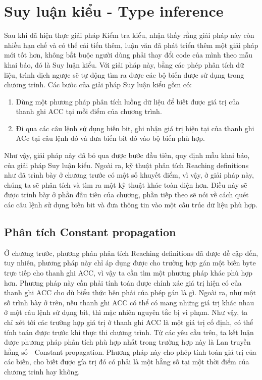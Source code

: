 \section{Suy luận kiểu - Type inference}
Sau khi đã hiện thực giải pháp Kiểm tra kiểu, nhận thấy rằng giải pháp này còn nhiều hạn chế và có thể cải tiến thêm, luận văn đã phát triển thêm một giải pháp mới tốt hơn, không bắt buộc người dùng phải thay đổi code của mình theo mẫu khai báo, đó là Suy luận kiểu. Với giải pháp này, bằng các phép phân tích dữ liệu, trình dịch ngược sẽ tự động tìm ra được các bộ biến được sử dụng trong chương trình. Các bước của giải pháp Suy luận kiểu gồm có:
\begin{enumerate}
	\item Dùng một phương pháp phân tích luồng dữ liệu để biết được giá trị của thanh ghi ACC tại mỗi điểm của chương trình.
	\item Đi qua các câu lệnh sử dụng biến bit, ghi nhận giá trị hiện tại của thanh ghi ACc tại câu lệnh đó và đưa biến bit đó vào bộ biến phù hợp.
\end{enumerate}
Như vậy, giải pháp này đã bỏ qua được bước đầu tiên, quy định mẫu khai báo, của giải pháp Suy luận kiểu. Ngoài ra, kỹ thuật phân tích Reaching definitions như đã trình bày ở chương trước có một số khuyết điểm, vì vậy, ở giải pháp này, chúng ta sẽ phân tích và tìm ra một kỹ thuật khác toàn diện hơn. Điều này sẽ được trình bày ở phần đầu tiên của chương, phần tiếp theo sẽ nói về cách quét các câu lệnh sử dụng biến bit và đưa thông tin vào một cấu trúc dữ liệu phù hợp.

\subsection{Phân tích Constant propagation}
Ở chương trước, phương phán phân tích Reaching definitions đã được đề cập đến, tuy nhiên, phương pháp này chỉ áp dụng được cho trường hợp gán một biến byte trực tiếp cho thanh ghi ACC, vì vậy ta cần tìm một phương pháp khác phù hợp hơn. Phương pháp này cần phải tính toán được chính xác giá trị hiện có của thanh ghi ACC cho dù biểu thức bên phải của phép gán là gì. Ngoài ra, như một số trình bày ở trên, nếu thanh ghi ACC có thể có mang những giá trị khác nhau ở một câu lệnh sử dụng bit, thì mặc nhiên nguyên tắc bị vi phạm. Như vậy, ta chỉ xét tới các trường hợp giá trị ở thanh ghi ACC là một giá trị cố định, có thể tính toán được trước khi thực thi chương trình. Từ các yêu cầu trên, ta kết luận được phương pháp phân tích phù hợp nhất trong trường hợp này là Lan truyền hằng số - Constant propagation. Phương pháp này cho phép tính toán giá trị của các biến, cho biết được gía trị đó có phải là một hằng số tại một thời điểm của chương trình hay không.

